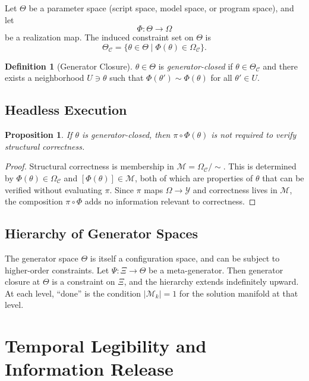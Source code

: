 \documentclass[11pt, twoside]{article}
\theoremstyle{plain}
\newtheorem{proposition}[theorem]{Proposition}
\theoremstyle{definition}
\newtheorem{definition}[theorem]{Definition}
\theoremstyle{remark}
\newcommand{\OmC}{\Omega_{\mathcal{C}}}
\begin{document}
Let $\Theta$ be a parameter space (script space, model space, or program space), and let
\[
\Phi : \Theta \to \Omega
\]
be a realization map. The induced constraint set on $\Theta$ is
\[
\Theta_{\mathcal{C}} = \{ \theta \in \Theta \mid \Phi(\theta) \in \OmC \}.
\]

\begin{definition}[Generator Closure]
$\theta \in \Theta$ is \emph{generator-closed} if $\theta \in \Theta_{\mathcal{C}}$ and there exists a neighborhood $U \ni \theta$ such that $\Phi(\theta') \sim \Phi(\theta)$ for all $\theta' \in U$.
\end{definition}

\subsection{Headless Execution}

\begin{proposition}
If $\theta$ is generator-closed, then $\pi \circ \Phi(\theta)$ is not required to verify structural correctness.
\end{proposition}

\begin{proof}
Structural correctness is membership in $\mathcal{M} = \OmC / {\sim}$. This is determined by $\Phi(\theta) \in \OmC$ and $[\Phi(\theta)] \in \mathcal{M}$, both of which are properties of $\theta$ that can be verified without evaluating $\pi$. Since $\pi$ maps $\Omega \to \mathcal{Y}$ and correctness lives in $\mathcal{M}$, the composition $\pi \circ \Phi$ adds no information relevant to correctness.
\end{proof}

\subsection{Hierarchy of Generator Spaces}

The generator space $\Theta$ is itself a configuration space, and can be subject to higher-order constraints. Let $\Psi : \Xi \to \Theta$ be a meta-generator. Then generator closure at $\Theta$ is a constraint on $\Xi$, and the hierarchy extends indefinitely upward. At each level, ``done'' is the condition $|\mathcal{M}_k| = 1$ for the solution manifold at that level.

\section{Temporal Legibility and Information Release}
\label{app:legibility}
\end{document}
